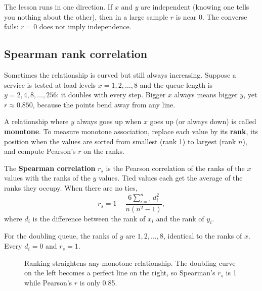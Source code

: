 The lesson runs in one direction. If $x$ and $y$ are independent (knowing one tells
you nothing about the other), then in a large sample $r$ is near $0$. The converse fails: $r=0$ does
not imply independence.

\subsection{Spearman rank correlation}

Sometimes the relationship is curved but still always increasing. Suppose a service
is tested at load levels $x = 1, 2, \dots, 8$ and the queue length is
$y = 2, 4, 8, \dots, 256$: it doubles with every step. Bigger $x$ always means
bigger $y$, yet $r \approx 0.850$, because the points bend away from any line.

A relationship where $y$ always goes up when $x$ goes up (or always down) is
called \textbf{monotone}. To measure monotone association, replace each value by
its \textbf{rank}, its position when the values are sorted from smallest (rank 1)
to largest (rank $n$), and compute Pearson's $r$ on the ranks.

\begin{definition}
The \textbf{Spearman correlation} $r_s$ is the Pearson correlation of the ranks of
the $x$ values with the ranks of the $y$ values. Tied values each get the average
of the ranks they occupy. When there are no ties,
\[
  r_s = 1 - \frac{6\sum_{i=1}^n d_i^2}{n(n^2-1)},
\]
where $d_i$ is the difference between the rank of $x_i$ and the rank of $y_i$.
\end{definition}

For the doubling queue, the ranks of $y$ are $1, 2, \dots, 8$, identical to the
ranks of $x$. Every $d_i = 0$ and $r_s = 1$.

\begin{figure}[H]
\centering
{}
\caption{Ranking straightens any monotone relationship. The doubling curve on the
left becomes a perfect line on the right, so Spearman's $r_s$ is 1 while Pearson's
$r$ is only 0.85.}
\label{fig:two-variables-spearman}
\end{figure}


